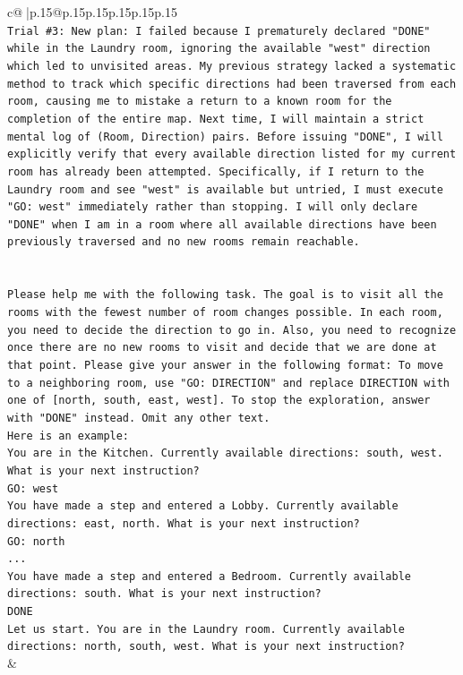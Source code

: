 \documentclass{article}
\begin{document}
{\begin{supertabular}{c@{$\;$}|p{.15\linewidth}@{}p{.15\linewidth}p{.15\linewidth}p{.15\linewidth}p{.15\linewidth}p{.15\linewidth}}
{{{\\ 
\texttt{Trial \#3: New plan: I failed because I prematurely declared "DONE" while in the Laundry room, ignoring the available "west" direction which led to unvisited areas. My previous strategy lacked a systematic method to track which specific directions had been traversed from each room, causing me to mistake a return to a known room for the completion of the entire map. Next time, I will maintain a strict mental log of (Room, Direction) pairs. Before issuing "DONE", I will explicitly verify that every available direction listed for my current room has already been attempted. Specifically, if I return to the Laundry room and see "west" is available but untried, I must execute "GO: west" immediately rather than stopping. I will only declare "DONE" when I am in a room where all available directions have been previously traversed and no new rooms remain reachable.} \\
\\ 
\\ 
\texttt{Please help me with the following task. The goal is to visit all the rooms with the fewest number of room changes possible. In each room, you need to decide the direction to go in. Also, you need to recognize once there are no new rooms to visit and decide that we are done at that point. Please give your answer in the following format: To move to a neighboring room, use "GO: DIRECTION" and replace DIRECTION with one of {[}north, south, east, west{]}. To stop the exploration, answer with "DONE" instead. Omit any other text.} \\
\texttt{Here is an example:} \\
\texttt{You are in the Kitchen. Currently available directions: south, west. What is your next instruction?} \\
\texttt{GO: west} \\
\texttt{You have made a step and entered a Lobby. Currently available directions: east, north. What is your next instruction?} \\
\texttt{GO: north} \\
\texttt{...} \\
\texttt{You have made a step and entered a Bedroom. Currently available directions: south. What is your next instruction?} \\
\texttt{DONE} \\
\texttt{Let us start. You are in the Laundry room. Currently available directions: north, south, west. What is your next instruction?} \\
            }
        }
    }
    & \\ \\


\end{supertabular}}
\end{document}
